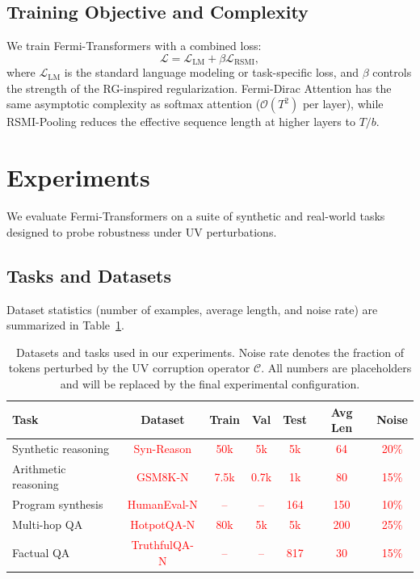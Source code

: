 \documentclass{article}
\newcommand{\TODO}[1]{\textcolor{red}{#1}}
\begin{document}
\subsection{Training Objective and Complexity}

We train Fermi-Transformers with a combined loss:
\begin{equation}
    \mathcal{L} = 
    \mathcal{L}_{\text{LM}} + 
    \beta \mathcal{L}_{\text{RSMI}},
\end{equation}
where $\mathcal{L}_{\text{LM}}$ is the standard language modeling or task-specific loss, and $\beta$ controls the strength of the RG-inspired regularization. Fermi-Dirac Attention has the same asymptotic complexity as softmax attention ($\mathcal{O}(T^2)$ per layer), while RSMI-Pooling reduces the effective sequence length at higher layers to $T/b$.

\section{Experiments}

We evaluate Fermi-Transformers on a suite of synthetic and real-world tasks designed to probe robustness under UV perturbations.

\subsection{Tasks and Datasets}

Dataset statistics (number of examples, average length, and noise rate) are summarized in Table~\ref{tab:datasets}.

\begin{table}[t]
    \centering
    \small
    \caption{Datasets and tasks used in our experiments. Noise rate denotes the fraction of tokens perturbed by the UV corruption operator $\mathcal{C}$. All numbers are placeholders and will be replaced by the final experimental configuration.}
    \label{tab:datasets}
    \begin{tabular}{lcccccc}
        \toprule
        Task & Dataset & Train & Val & Test & Avg Len & Noise \\
        \midrule
        Synthetic reasoning & \TODO{Syn-Reason} & \TODO{50k} & \TODO{5k} & \TODO{5k} & \TODO{64} & \TODO{20\%} \\
        Arithmetic reasoning & \TODO{GSM8K-N} & \TODO{7.5k} & \TODO{0.7k} & \TODO{1k} & \TODO{80} & \TODO{15\%} \\
        Program synthesis & \TODO{HumanEval-N} & \TODO{--} & \TODO{--} & \TODO{164} & \TODO{150} & \TODO{10\%} \\
        Multi-hop QA & \TODO{HotpotQA-N} & \TODO{80k} & \TODO{5k} & \TODO{5k} & \TODO{200} & \TODO{25\%} \\
        Factual QA & \TODO{TruthfulQA-N} & \TODO{--} & \TODO{--} & \TODO{817} & \TODO{30} & \TODO{15\%} \\
        \bottomrule
    \end{tabular}
\end{table}
\end{document}
